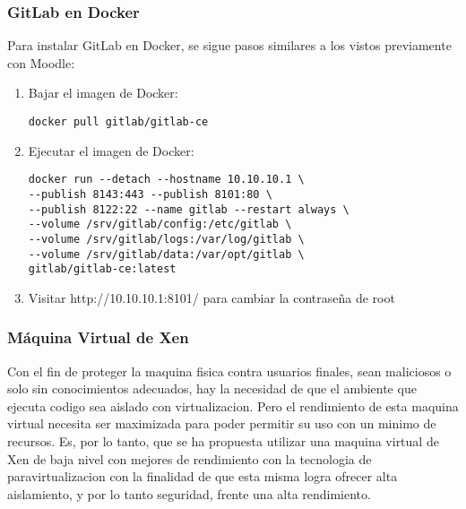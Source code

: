 \subsubsection{GitLab en Docker}
Para instalar GitLab en Docker, se sigue pasos similares a los vistos previamente con Moodle:
\begin{enumerate}
	\item Bajar el imagen de Docker:
    \begin{lstlisting}    
docker pull gitlab/gitlab-ce
    \end{lstlisting}
    \item Ejecutar el imagen de Docker:
    \begin{lstlisting}    
docker run --detach --hostname 10.10.10.1 \
--publish 8143:443 --publish 8101:80 \
--publish 8122:22 --name gitlab --restart always \
--volume /srv/gitlab/config:/etc/gitlab \
--volume /srv/gitlab/logs:/var/log/gitlab \
--volume /srv/gitlab/data:/var/opt/gitlab \
gitlab/gitlab-ce:latest
    \end{lstlisting}
    \item Visitar http://10.10.10.1:8101/ para cambiar la contraseña de root
\end{enumerate}

\index{Hipervisor} \index{Virtualización} 
\subsubsection{Máquina Virtual de Xen}
Con el fin de proteger la maquina fisica contra usuarios finales, sean maliciosos o solo sin conocimientos adecuados, hay la necesidad de que el ambiente que ejecuta codigo sea aislado con virtualizacion. Pero el rendimiento de esta maquina virtual necesita ser maximizada para poder permitir su uso con un minimo de recursos. Es, por lo tanto, que se ha propuesta utilizar una maquina virtual de Xen de baja nivel con mejores de rendimiento con la tecnologia de paravirtualizacion con la finalidad de que esta misma logra ofrecer alta aislamiento, y por lo tanto seguridad, frente una alta rendimiento.

